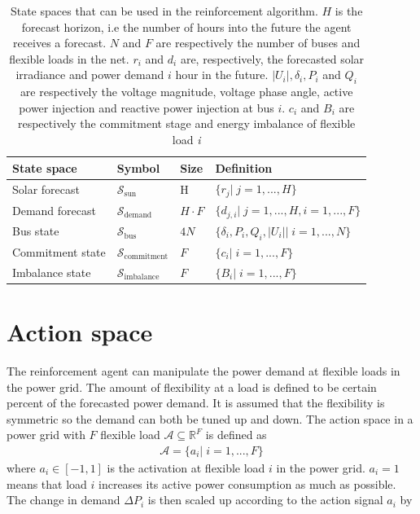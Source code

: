 \documentclass[class=book, crop=false, 11pt]{standalone}
\begin{document}
\begin{table}[ht]
\centering
\caption{State spaces that can be used in the reinforcement algorithm. $H$ is the forecast horizon, i.e the number of hours into the future the agent receives a forecast. $N$ and $F$ are respectively the number of buses and flexible loads in the net. $r_{i}$ and $d_{i}$ are, respectively, the forecasted solar irradiance and power demand $i$ hour in the future. $|U_{i}|,\delta_{i}, P_{i}$ and $Q_{i}$ are respectively the voltage magnitude, voltage phase angle, active power injection and reactive power injection at bus $i$. $c_{i}$ and $B_{i}$ are respectively the commitment stage and energy imbalance of flexible load \textit{i}}
\label{table:state_spaces}
\begin{tabular}{l|lll}

State space  & Symbol & Size & Definition
\\ 
\hline
Solar forecast      & $\mathcal{S}_{\textrm{sun}}$& H  &  $\{r_{j} |\;j=1,...,H\}$
\\ 

Demand forecast    & $\mathcal{S}_{\textrm{demand}}$ &$H\cdot F$ &$\{d_{j,i} |\;j=1,...,H,i=1,...,F\}$  \\ 
Bus state & $\mathcal{S}_{\textrm{bus}}$ & $4N$ &$\{\delta_{i}, P_{i}, Q_{i}, |U_{i}| |\; i = 1,...,N\}$\\

Commitment state &$\mathcal{S}_{\textrm{commitment}}$& $F$  &$\{ c_{i} |\; i = 1,...,F\}$ \\
 
Imbalance state &$\mathcal{S}_{\textrm{imbalance}}$& $F$  &$\{ B_{i} |\; i = 1,...,F\}$ \\

\hline
\end{tabular}
\end{table}
\section{Action space}
The reinforcement agent can manipulate the power demand at flexible loads in the power grid. The amount of flexibility at a load is defined to be certain percent of the forecasted power demand. It is assumed that the flexibility is symmetric so the demand can both be tuned up and down. The action space in a power grid with $F$ flexible load  $\mathcal{A}  \subseteq \mathbb{R}^{F}$ is defined as
\begin{equation}
   \begin{aligned}
   \label{eq:problem:action_space}
\mathcal{A}= \{a_{i} | \;i = 1,...,F\}
    \end{aligned} 
\end{equation}
where $a_{i} \in [-1,1]$ is the activation at flexible load $i$ in the power grid. $a_{i} = 1$ means that load $i$ increases its active power consumption as much as possible. The change in demand $\Delta P_{i}$ is then scaled up according to the action signal $a_{i}$ by
\end{document}
